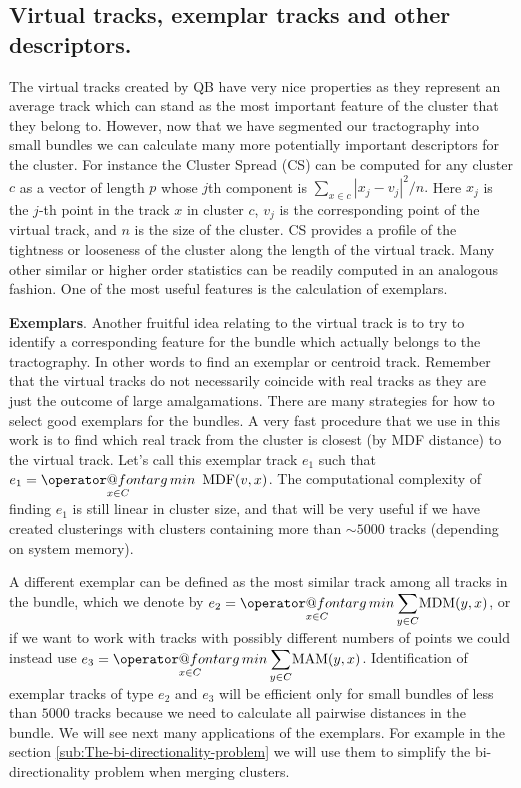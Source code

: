 \documentclass[preprint,authoryear,a4paper,10pt,onecolumn]{elsarticle}
\makeatletter
\def\argmin{\mathop{\operator@font arg\,min}}
\makeatother
\begin{document}
\subsection{Virtual tracks, exemplar tracks and other descriptors.}

The virtual tracks created by QB have very nice properties as they
represent an average track which can stand as the most important feature
of the cluster that they belong to. However, now that we have segmented
our tractography into small bundles we can calculate many more
potentially important descriptors for the cluster. For instance the
Cluster Spread (CS) can be computed for any cluster $c$ as a vector of
length $p$ whose $j$th component is $\sum_{x\in c}|x_{j}-v_{j}|^{2}/n.$
Here $x_{j}$ is the $j$-th point in the track $x$ in cluster $c$,
$v_{j}$ is the corresponding point of the virtual track, and $n$ is the
size of the cluster. CS provides a profile of the tightness or looseness
of the cluster along the length of the virtual track. Many other similar
or higher order statistics can be readily computed in an analogous
fashion. One of the most useful features is the calculation of
exemplars.

\textbf{Exemplars}. Another fruitful idea relating to the virtual track
is to try to identify a corresponding feature for the bundle which
actually belongs to the tractography. In other words to find an exemplar
or centroid track. Remember that the virtual tracks do not necessarily
coincide with real tracks as they are just the outcome of large
amalgamations. There are many strategies for how to select good
exemplars for the bundles. A very fast procedure that we use in this
work is to find which real track from the cluster is closest (by MDF
distance) to the virtual track. Let's call this exemplar track $e_{1}$
such that $e_{1}={\displaystyle \argmin_{x\in C}}\textrm{\,\ MDF}(v,x)$.
The computational complexity of finding $e_{1}$ is still linear in
cluster size, and that will be very useful if we have created
clusterings with clusters containing more than $\sim5000$ tracks
(depending on system memory).

A different exemplar can be defined as the most similar track among all
tracks in the bundle, which we denote by $e_{2}={\displaystyle
  \argmin_{x\in C}}\,{\displaystyle \sum_{y\in C}}\mathrm{MDM(}y,x)$, or
if we want to work with tracks with possibly different numbers of points
we could instead use $e_{3}={\displaystyle \argmin_{x\in
    C}}\,{\displaystyle \sum_{y\in C}}\mathrm{MAM(}y,x)$.
Identification of exemplar tracks of type $e_{2}$ and $e_{3}$ will be
efficient only for small bundles of less than $5000$ tracks because we
need to calculate all pairwise distances in the bundle. We will see next
many applications of the exemplars. For example in the section
\ref{sub:The-bi-directionality-problem} we will use them to simplify the
bi-directionality problem when merging clusters.
\end{document}
